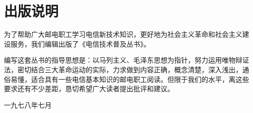 \chapter{出版说明}

为了帮助广大邮电职工学习电信新技术知识，更好地为社会主义革命和社会主义建设服务，我们编辑出版了《电信技术普及丛书》。

编写这套丛书的指导思想是：以马列主义、毛泽东思想为指针，努力运用唯物辩证法，密切结合三大革命运动的实际，力求做到内容正确，概念清楚，深入浅出，通俗易懂，适合具有一些电信基本知识的邮电职工阅读。但限于我们的水平，离这些要求还有不少差距，恳切希望广大读者提出批评和建议。



\begin{center}
	\raggedleft 一九七八年七月
\end{center}

